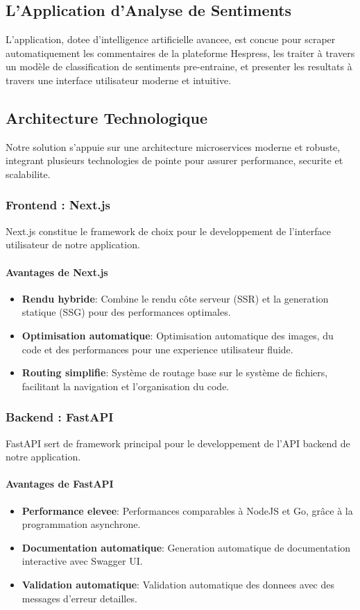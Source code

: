 \subsection{L'Application d'Analyse de Sentiments}
L'application, dotee d'intelligence artificielle avancee, est concue pour scraper automatiquement les commentaires de la plateforme Hespress, les traiter à travers un modèle de classification de sentiments pre-entraine, et presenter les resultats à travers une interface utilisateur moderne et intuitive.

\subsection{Architecture Technologique}
Notre solution s'appuie sur une architecture microservices moderne et robuste, integrant plusieurs technologies de pointe pour assurer performance, securite et scalabilite.
\subsubsection{Frontend : Next.js}
Next.js constitue le framework de choix pour le developpement de l'interface utilisateur de notre application.

\paragraph{Avantages de Next.js}
\begin{itemize}
    \item \textbf{Rendu hybride}: Combine le rendu côte serveur (SSR) et la generation statique (SSG) pour des performances optimales.
    \item \textbf{Optimisation automatique}: Optimisation automatique des images, du code et des performances pour une experience utilisateur fluide.
    \item \textbf{Routing simplifie}: Système de routage base sur le système de fichiers, facilitant la navigation et l'organisation du code.
\end{itemize}

\subsubsection{Backend : FastAPI}
FastAPI sert de framework principal pour le developpement de l'API backend de notre application.

\paragraph{Avantages de FastAPI}
\begin{itemize}
    \item \textbf{Performance elevee}: Performances comparables à NodeJS et Go, grâce à la programmation asynchrone.
    \item \textbf{Documentation automatique}: Generation automatique de documentation interactive avec Swagger UI.
    \item \textbf{Validation automatique}: Validation automatique des donnees avec des messages d'erreur detailles.
\end{itemize}

